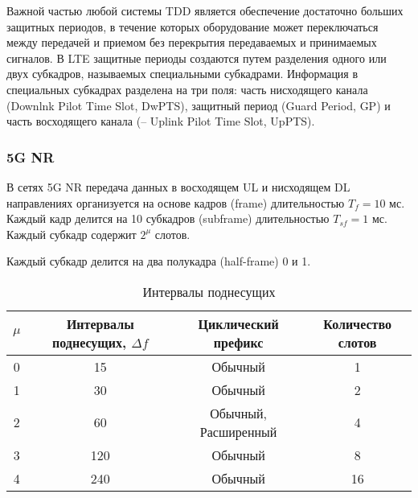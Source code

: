 Важной частью любой системы TDD является обеспечение достаточно больших защитных периодов, в течение которых оборудование может переключаться между передачей и приемом без перекрытия передаваемых и принимаемых сигналов. В LTE защитные периоды создаются путем разделения одного или двух субкадров, называемых специальными субкадрами. Информация в специальных субкадрах разделена на три поля: часть нисходящего канала (Downlnk Pilot Time Slot, DwPTS), защитный период (Guard Period, GP) и часть восходящего канала (– Uplink Pilot Time Slot, UpPTS).


\subsubsection{5G NR}
В сетях 5G NR передача данных в восходящем UL и нисходящем DL направлениях организуется на основе кадров (frame) длительностью $T_f=10$ мс. Каждый кадр делится на 10 субкадров (subframe) длительностью $T_{sf}= 1$ мс. Каждый субкадр содержит $2^\mu$ слотов. \cite{Lien2017, Omri2019}

Каждый субкадр делится на два полукадра (half-frame) 0 и 1.




\begin{table}[h!]\centering
  \begin{tabular}{|c|c|c|c|}\hline

      $\mu$ & Интервалы поднесущих, $\Delta f$ & Циклический префикс & Количество слотов \\
      \hline
      0& 15 & Обычный& 1  \\
      1& 30 & Обычный& 2  \\
      2& 60 & Обычный, Расширенный& 4  \\
      3& 120 & Обычный& 8  \\
      4& 240 & Обычный& 16  \\

      \hline

\end{tabular}\caption{ Интервалы поднесущих}\label{tab:part1_5g_slot}
\end{table}




